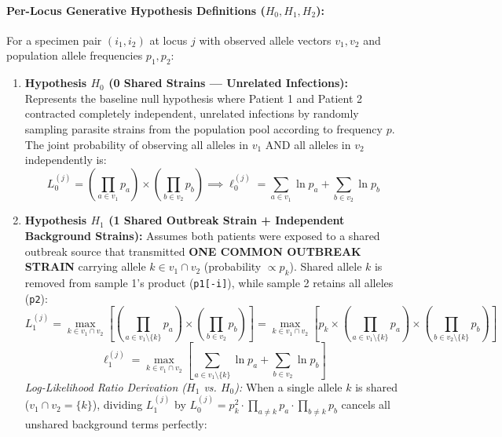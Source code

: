 \documentclass[11pt,a4paper]{article}
\begin{document}
\paragraph{Per-Locus Generative Hypothesis Definitions ($H_0, H_1, H_2$):}
For a specimen pair $(i_1, i_2)$ at locus $j$ with observed allele vectors $v_1, v_2$ and population allele frequencies $p_1, p_2$:
\begin{enumerate}[leftmargin=*]
    \item \textbf{Hypothesis $H_0$ (0 Shared Strains — Unrelated Infections):} Represents the baseline null hypothesis where Patient 1 and Patient 2 contracted completely independent, unrelated infections by randomly sampling parasite strains from the population pool according to frequency $p$. The joint probability of observing all alleles in $v_1$ AND all alleles in $v_2$ independently is:
    \begin{equation}
    L_0^{(j)} = \left( \prod_{a \in v_1} p_a \right) \times \left( \prod_{b \in v_2} p_b \right) \implies \ell_0^{(j)} = \sum_{a \in v_1} \ln p_a + \sum_{b \in v_2} \ln p_b
    \end{equation}
    \item \textbf{Hypothesis $H_1$ (1 Shared Outbreak Strain + Independent Background Strains):} Assumes both patients were exposed to a shared outbreak source that transmitted \textbf{ONE COMMON OUTBREAK STRAIN} carrying allele $k \in v_1 \cap v_2$ (probability $\propto p_k$). Shared allele $k$ is removed from sample 1's product (\texttt{p1[-i]}), while sample 2 retains all alleles (\texttt{p2}):
    \begin{equation}
    L_1^{(j)} = \max_{k \in v_1 \cap v_2} \left[ \left(\prod_{a \in v_1 \setminus \{k\}} p_a\right) \times \left(\prod_{b \in v_2} p_b\right) \right] = \max_{k \in v_1 \cap v_2} \left[ p_k \times \left(\prod_{a \in v_1 \setminus \{k\}} p_a\right) \times \left(\prod_{b \in v_2 \setminus \{k\}} p_b\right) \right]
    \end{equation}
    \begin{equation}
    \ell_1^{(j)} = \max_{k \in v_1 \cap v_2} \left[ \sum_{a \in v_1 \setminus \{k\}} \ln p_a + \sum_{b \in v_2} \ln p_b \right]
    \end{equation}
    \textit{Log-Likelihood Ratio Derivation ($H_1$ vs. $H_0$):} When a single allele $k$ is shared ($v_1 \cap v_2 = \{k\}$), dividing $L_1^{(j)}$ by $L_0^{(j)} = p_k^2 \cdot \prod_{a \neq k} p_a \cdot \prod_{b \neq k} p_b$ cancels all unshared background terms perfectly:
    \begin{equation}

\end{equation}
\end{enumerate}
\end{document}
